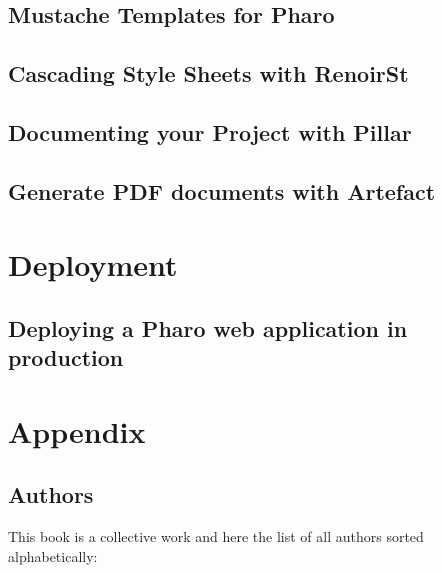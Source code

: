 \documentclass[10pt,twoside]{support/latex/sbabook}
\begin{document}
\chapter{Mustache Templates for Pharo}


\chapter{Cascading Style Sheets with RenoirSt}


\chapter{Documenting your Project with Pillar}



\chapter{Generate PDF documents with Artefact}


\part{Deployment}

\chapter{Deploying a Pharo web application in production}


\appendix

\part{Appendix}

\chapter{Authors}

This book is a collective work and here the list of all authors sorted alphabetically:
\end{document}
